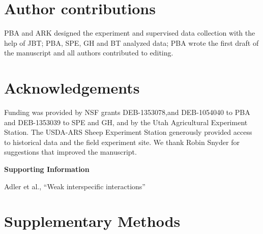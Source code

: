\documentclass[11pt]{article}
\begin{document}
\begin{doublespacing}
\section*{Author contributions}

PBA and ARK designed the experiment and supervised data collection with the help of JBT; PBA, SPE, GH and BT analyzed data; PBA wrote the first draft of the manuscript and all authors contributed to editing.

\section*{Acknowledgements}

Funding was provided by NSF grants DEB-1353078,and  DEB-1054040 to PBA and DEB-1353039 to SPE and GH, and by the Utah Agricultural Experiment Station. The USDA-ARS Sheep Experiment Station generously provided access to historical data and the field experiment site.  We thank Robin Snyder for suggestions that improved the manuscript.





\end{doublespacing} 


\clearpage 
\newpage 

\setcounter{page}{1}
\setcounter{equation}{0}
\setcounter{figure}{0}
\setcounter{section}{0}
\setcounter{table}{0}
\renewcommand{\theequation}{SI.\arabic{equation}}
\renewcommand{\thetable}{SI-\arabic{table}}
\renewcommand{\thefigure}{SI-\arabic{figure}}
\renewcommand{\thesection}{Section SI.\arabic{section}}

\centerline{\Large \textbf{Supporting Information }}
\centerline{Adler et al., ``Weak interspecific interactions''} 

\vspace{0.4in} 

\section{Supplementary Methods} \label{suppMethods}
\end{document}
